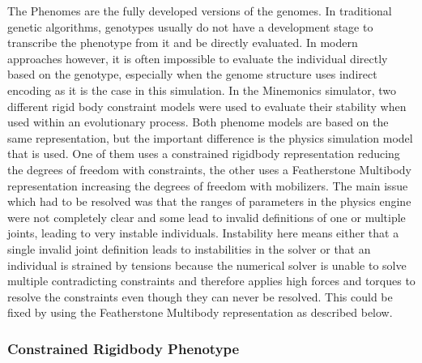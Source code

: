 \documentclass[main]{subfiles}
\begin{document}
The Phenomes are the fully developed versions of the genomes. In traditional genetic algorithms, genotypes usually do not have a development stage to transcribe the phenotype from it and be directly evaluated. In modern approaches however, it is often impossible to evaluate the individual directly based on the genotype, especially when the genome structure uses indirect encoding as it is the case in this simulation.
In the Minemonics simulator, two different rigid body constraint models were used to evaluate their stability when used within an evolutionary process. Both phenome models are based on the same representation, but the important difference is the physics simulation model that is used. One of them uses a constrained rigidbody representation reducing the degrees of freedom with constraints, the other uses a Featherstone Multibody representation increasing the degrees of freedom with mobilizers. The main issue which had to be resolved was that the ranges of parameters in the physics engine were not completely clear and some lead to invalid definitions of one or multiple joints, leading to very instable individuals. Instability here means either that a single invalid joint definition leads to instabilities in the solver or that an individual is strained by tensions because the numerical solver is unable to solve multiple contradicting constraints and therefore applies high forces and torques to resolve the constraints even though they can never be resolved. This could be fixed by using the Featherstone Multibody representation as described below. 

\subsubsection{Constrained Rigidbody Phenotype}
\end{document}

